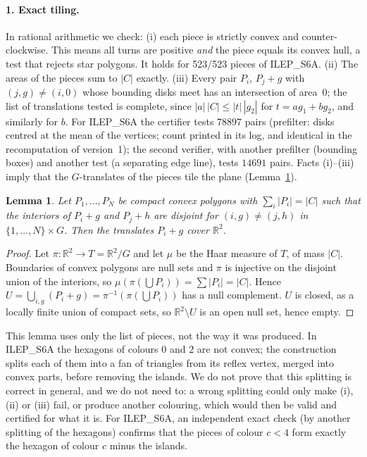 \documentclass[10pt,a4paper]{article}
\newtheorem{lemma}[theorem]{Lemma}
\newcommand{\R}{\mathbb{R}}
\begin{document}
\paragraph{1. Exact tiling.} In rational arithmetic we check: (i) each piece is strictly
convex and counter-clockwise. This means all turns are positive \emph{and} the piece equals its
convex hull, a test that rejects star polygons. It holds for 523/523 pieces of ILEP\_S6A. (ii) The areas
of the pieces sum to $|C|$ exactly. (iii) Every pair $P_i$, $P_j+g$ with $(j,g)\ne(i,0)$ whose
bounding disks meet has an intersection of area~$0$; the list of translations tested is complete, since
$|a|\,|C|\le|t|\,|g_2|$ for $t=ag_1+bg_2$, and similarly for $b$. For ILEP\_S6A the certifier tests $78897$ pairs (prefilter: disks centred at the mean of the vertices;
count printed in its log, and identical in the recomputation of version~1); the second verifier, with
another prefilter (bounding boxes) and another test (a separating edge line), tests $14691$ pairs.
Facts (i)--(iii) imply that the $G$-translates of the pieces tile the plane (Lemma~\ref{lem:tiling}).

\begin{lemma}\label{lem:tiling}
Let $P_1,\dots,P_N$ be compact convex polygons with $\sum_i|P_i|=|C|$ such that the interiors of $P_i+g$ and
$P_j+h$ are disjoint for $(i,g)\ne(j,h)$ in $\{1,\dots,N\}\times G$. Then the translates $P_i+g$ cover $\R^2$.
\end{lemma}
\begin{proof}
Let $\pi:\R^2\to T=\R^2/G$ and let $\mu$ be the Haar measure of $T$, of mass $|C|$. Boundaries of convex
polygons are null sets and $\pi$ is injective on the disjoint union of the interiors, so
$\mu(\pi(\bigcup P_i))=\sum|P_i|=|C|$. Hence $U=\bigcup_{i,g}(P_i+g)=\pi^{-1}(\pi(\bigcup P_i))$ has a null
complement. $U$ is closed, as a locally finite union of compact sets, so $\R^2\setminus U$ is an open null set,
hence empty.
\end{proof}

This lemma uses only the list of pieces, not the way it was produced. In ILEP\_S6A the hexagons of colours $0$
and $2$ are not convex; the construction splits each of them into a fan of triangles from its reflex vertex,
merged into convex parts, before removing the islands. We do not prove that this splitting is correct in
general, and we do not need to: a wrong splitting could only make (i), (ii) or (iii) fail, or produce another
colouring, which would then be valid and certified for what it is. For ILEP\_S6A, an independent exact check
(by another splitting of the hexagons) confirms that the pieces of colour $c<4$ form exactly the hexagon of
colour $c$ minus the islands. 
\end{document}
